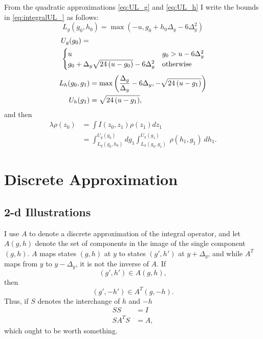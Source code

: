 \documentclass[twocolumn]{article}
\begin{document}
From the quadratic approximations \eqref{eq:UL_g} and \eqref{eq:UL_h}
I write the bounds in \eqref{eq:integralUL_} as follows:
\begin{equation*}
  L_g(g_0, h_0) = \max \left( -u, g_0 + h_0 \Delta_y - 6 \Delta_y^2
  \right)  
\end{equation*}
\begin{align*}
  &U_g(g_0) = \\
  &\begin{cases}
    u & g_0 > u - 6 \Delta_y^2 \\
    g_0 + \Delta_y\sqrt{24\left(u-g_0\right)} - 6 \Delta_y^2 & \text{otherwise}
  \end{cases}
\end{align*}
\begin{align*}
  L_h(g_0, g_1) &= \max \left( \frac{\Delta_g}{\Delta_y} - 6
    \Delta_y, - \sqrt{24\left(u-g_1\right)} \right) \\
  U_h(g_1) &= \sqrt{24\left(u-g_1\right)} ,
\end{align*}
and then
\newcommand{\Ug}{ g_0 + \Delta_y\Rad{-g_0}}
\newcommand{\Lg}{g_0 + h_0\Delta_y}
\newcommand{\Lh}{\frac{\Delta_g}{\Delta_y}}
\begin{align}
  \lambda \rho(z_0) &= \int I(z_0, z_1) \rho(z_1) d
  z_1 \nonumber \\
  \label{eq:integralULq}
    &= \int_{L_g(g_0, h_0)}^{U_g(g_0)} dg_1
    \int_{L_h(g_0,g_1)}^{U_h(g_1)}~ \rho(h_1,g_1) ~dh_1.
\end{align}

\section{Discrete Approximation}
\label{sec:approximate}


\subsection{2-d Illustrations}
\label{sec:ill}

I use $A$ to denote a discrete approximation of the integral operator,
and let $A(g,h)$ denote the set of components in the image of the
single component $(g,h)$.  $A$ maps states $(g,h)$ at $y$ to states
$(g',h')$ at $y+\Delta_y$, and while $A^T$ maps from $y$ to
$y-\Delta_y$, it is not the inverse of $A$.  If
\begin{equation*}
  (g',h') \in A(g,h),
\end{equation*}
then
\begin{equation*}
  (g', -h') \in A^T(g,-h).
\end{equation*}
Thus, if $S$ denotes the interchange of $h$ and $-h$
\begin{align*}
  SS &= I \\
  SA^TS &= A,
\end{align*}
which ought to be worth something.
\end{document}

